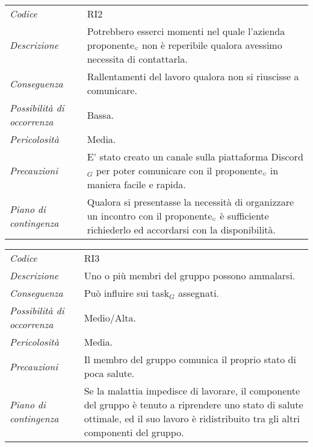 {{{{{{{{{{{{{\begin{center}
		\begin{longtable}{|p{5cm}|p{12cm}|}
			\hline
			\rowcolor{airforceblue}
			\multicolumn{2}{|c|}{\textit{Comunicazione esterna}}\\
			\hline
			\textit{Codice} & RI2 \\
			\hline
			\textit{Descrizione} & Potrebbero esserci momenti nel quale l'azienda proponente$_{\scaleto{G}{3pt}}$ non è reperibile qualora avessimo necessita di contattarla. \\
			\hline
			\textit{Conseguenza} & Rallentamenti del lavoro qualora non si riuscisse a comunicare. \\
			\hline
			\textit{Possibilità di occorrenza} & Bassa. \\
			\hline
			\textit{Pericolosità} & Media. \\
			\hline
			\textit{Precauzioni} & E' stato creato un canale sulla piattaforma Discord$_G$ per poter comunicare con il proponente$_{\scaleto{G}{3pt}}$ in maniera facile e rapida. \\
			\hline
			\textit{Piano di contingenza} & Qualora si presentasse la necessità di organizzare un incontro con il proponente$_{\scaleto{G}{3pt}}$ è sufficiente richiederlo ed accordarsi con la disponibilità.\\
			\hline
		\end{longtable}
	\end{center}

\def\tabularxcolumn#1{m{#1}}
{
	
	\begin{center}
		\renewcommand{\arraystretch}{1.4}
		
		\begin{longtable}{|p{5cm}|p{12cm}|}
			\hline
			\rowcolor{airforceblue}
			\multicolumn{2}{|c|}{\textit{Stato di malattia}}\\
			\hline
			\textit{Codice} & RI3 \\
			\hline
			\textit{Descrizione} & Uno o più membri del gruppo possono ammalarsi. \\
			\hline
			\textit{Conseguenza} & Può influire sui task$_G$ assegnati. \\
			\hline
			\textit{Possibilità di occorrenza} & Medio/Alta. \\
			\hline
			\textit{Pericolosità} & Media. \\
			\hline
			\textit{Precauzioni} & Il membro del gruppo comunica il proprio stato di poca salute. \\
			\hline
			\textit{Piano di contingenza} & Se la malattia impedisce di lavorare, il componente del gruppo è tenuto a riprendere uno stato di salute ottimale, ed il suo lavoro è ridistribuito tra gli altri componenti del gruppo.\\
			\hline
		\end{longtable}
	\end{center}

}}}}}}}}}}}}}}
